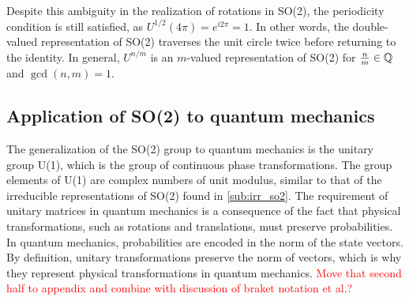     Despite this ambiguity in the realization of rotations in SO(2), the periodicity condition is still satisfied, as $U^{1/2}(4\pi) = e^{i2\pi} = 1$. In other words, the double-valued representation of SO(2) traverses the unit circle twice before returning to the identity. In general, $U^{n/m}$ is an $m$-valued representation of SO(2) for $\frac{n}{m}\in\mathbb{Q}$ and $\gcd(n,m)=1$.

    \subsection{Application of SO(2) to quantum mechanics}\label{sub:phys_J}
    The generalization of the SO(2) group to quantum mechanics is the unitary group U(1), which is the group of continuous phase transformations. The group elements of U(1) are complex numbers of unit modulus, similar to that of the irreducible representations of SO(2) found in \cref{sub:irr_so2}. The requirement of unitary matrices in quantum mechanics is a consequence of the fact that physical transformations, such as rotations and translations, must preserve probabilities. In quantum mechanics, probabilities are encoded in the norm of the state vectors. By definition, unitary transformations preserve the norm of vectors, which is why they represent physical transformations in quantum mechanics. \textcolor{red}{Move that second half to appendix and combine with discussion of braket notation et al.?}

